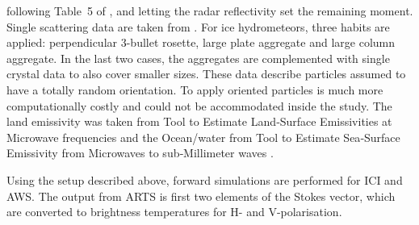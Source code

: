 \documentclass[amt, manuscript]{copernicus}
\begin{document}
following Table~5 of \citet{delanoe2014normalized}, and letting the radar
reflectivity set the remaining moment. Single scattering data are taken from
\citet{eriksson:agene:18}. For ice hydrometeors, three habits are applied:
perpendicular 3-bullet rosette, large plate aggregate and large column
aggregate. In the last two cases, the aggregates are complemented with single
crystal data to also cover smaller sizes. These data describe particles
assumed to have a totally random orientation. To apply oriented particles is
much more computationally costly and could not be accommodated inside the
study. The land emissivity was taken from Tool to Estimate Land‐Surface Emissivities at Microwave frequencies \citep[TELSEM,][]{aires2011tool} and the
Ocean/water from Tool to Estimate Sea‐Surface Emissivity from Microwaves to sub‐Millimeter waves \citep[TESSEM,][]{prigent2017sea}.

Using the setup described above, forward simulations are performed for ICI and AWS. The output from ARTS is first two elements of the Stokes vector,  which are converted to brightness temperatures for H- and V-polarisation. 
\end{document}
